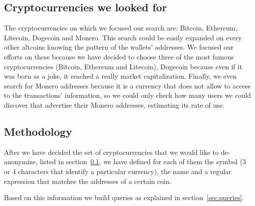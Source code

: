 \subsection{Cryptocurrencies we looked for}
\label{subsec:currencies}
The cryptocurrencies on which we focused our search are: Bitcoin, Ethereum,
Litecoin, Dogecoin and Monero. This search could be easily expanded on every
other altcoins knowing the pattern of the wallets' addresses. We focused our
efforts on these because we have decided to choose three of the most famous
cryptocurrencies (Bitcoin, Ethereum and Litecoin), Dogecoin because even if
it was born as a joke, it reached a really market capitalization. Finally, we
even search for Monero addresses because it is a currency that does not allow to
access to the transactions' information, so we could only check how many users
we could discover that advertise their Monero addresses, estimating its rate of
use. 

\subsection{Methodology}
\label{sec:methodology}
After we have decided the set of cryptocurrencies that we would like to
de-anonymize, listed in section~\ref{subsec:currencies}, we have defined for
each of them the symbol (3 or 4 characters that identify a particular
currency), the name and a regular expression that matches the addresses of a
certain coin.

Based on this information we build queries as explained in
section~\ref{sec:queries}.
